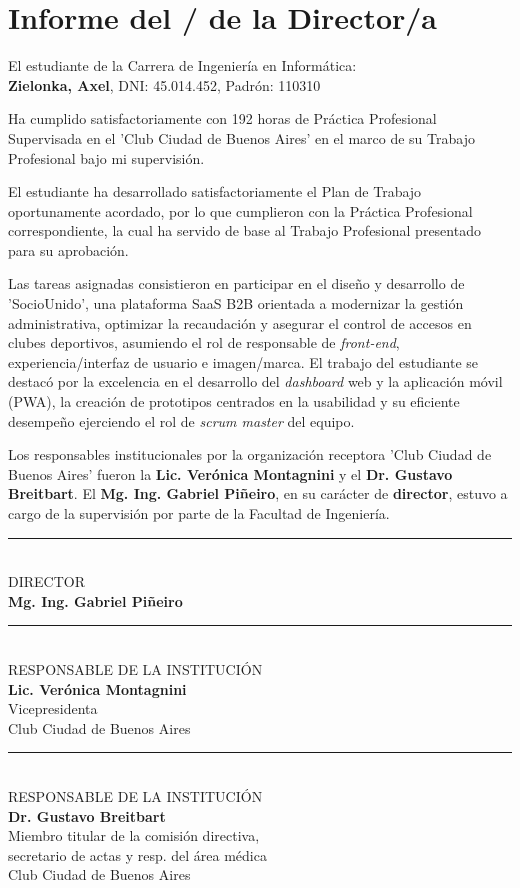 \section{Informe del / de la Director/a}

El estudiante de la Carrera de Ingeniería en Informática: \\ 
\textbf{Zielonka, Axel}, DNI: 45.014.452, Padrón: 110310

Ha cumplido satisfactoriamente con 192 horas de Práctica Profesional Supervisada en el 'Club Ciudad de Buenos Aires' en el marco de su Trabajo Profesional bajo mi supervisión.

El estudiante ha desarrollado satisfactoriamente el Plan de Trabajo oportunamente acordado, por lo que cumplieron con la Práctica Profesional correspondiente, la cual ha servido de base al Trabajo Profesional presentado para su aprobación.

Las tareas asignadas consistieron en participar en el diseño y desarrollo de 'SocioUnido', una plataforma SaaS B2B orientada a modernizar la gestión administrativa, optimizar la recaudación y asegurar el control de accesos en clubes deportivos, asumiendo el rol de responsable de \textit{front-end}, experiencia/interfaz de usuario e imagen/marca. El trabajo del estudiante se destacó por la excelencia en el desarrollo del \textit{dashboard} web y la aplicación móvil (PWA), la creación de prototipos centrados en la usabilidad y su eficiente desempeño ejerciendo el rol de \textit{scrum master} del equipo.

Los responsables institucionales por la organización receptora 'Club Ciudad de Buenos Aires' fueron la \textbf{Lic. Verónica Montagnini} y el \textbf{Dr. Gustavo Breitbart}. El \textbf{Mg. Ing. Gabriel Piñeiro}, en su carácter de \textbf{director}, estuvo a cargo de la supervisión por parte de la Facultad de Ingeniería.

\vspace{1.5cm}
\noindent\rule{8cm}{0.4pt} \\
DIRECTOR \\
\textbf{Mg. Ing. Gabriel Piñeiro}

\vspace{1.5cm}
\noindent
\begin{minipage}[t]{0.45\textwidth}
    \centering
    \rule{\linewidth}{0.4pt} \\
    RESPONSABLE DE LA INSTITUCIÓN \\
    \textbf{Lic. Verónica Montagnini} \\
    Vicepresidenta \\
    Club Ciudad de Buenos Aires
\end{minipage}
\hfill
\begin{minipage}[t]{0.45\textwidth}
    \centering
    \rule{\linewidth}{0.4pt} \\
    RESPONSABLE DE LA INSTITUCIÓN \\
    \textbf{Dr. Gustavo Breitbart} \\
    Miembro titular de la comisión directiva, \\
    secretario de actas y resp. del área médica \\
    Club Ciudad de Buenos Aires
\end{minipage}

